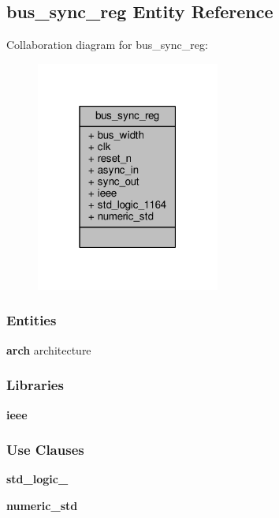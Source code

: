 \subsection{bus\+\_\+sync\+\_\+reg Entity Reference}
\label{classbus__sync__reg}


Collaboration diagram for bus\+\_\+sync\+\_\+reg\+:\nopagebreak
\begin{figure}[H]
\begin{center}
\leavevmode
\includegraphics[width=171pt]{d0/d17/classbus__sync__reg__coll__graph}
\end{center}
\end{figure}
\subsubsection*{Entities}
\begin{DoxyCompactItemize}
\item 
{\bf arch} architecture
\end{DoxyCompactItemize}
\subsubsection*{Libraries}
 \begin{DoxyCompactItemize}
\item 
{\bf ieee} 
\end{DoxyCompactItemize}
\subsubsection*{Use Clauses}
 \begin{DoxyCompactItemize}
\item 
{\bf std\+\_\+logic\+\_}   
\item 
{\bf numeric\+\_\+std}   
\end{DoxyCompactItemize}
